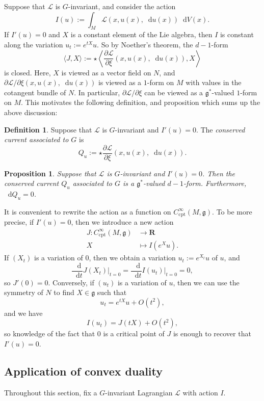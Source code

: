\documentclass[reqno,11pt]{amsart}
\newcommand{\RR}{\mathbf{R}}
\newcommand*\dif{\mathop{}\!\mathrm{d}}
\newcommand{\Lagrange}{\mathscr L}
\newcommand{\dfn}[1]{\emph{#1}\index{#1}}
\newcommand{\cpt}{\mathrm{cpt}}
\newtheorem{proposition}[theorem]{Proposition}
\theoremstyle{definition}
\newtheorem{definition}[theorem]{Definition}
\numberwithin{equation}{section}
\begin{document}
Suppose that $\Lagrange$ is $G$-invariant, and consider the action
$$I(u) := \int_M \Lagrange(x, u(x), \dif u(x)) \dif V(x).$$
If $I'(u) = 0$ and $X$ is a constant element of the Lie algebra, then $I$ is constant along the variation $u_t := e^{tX} u$.
So by Noether's theorem, the $d - 1$-form 
$$\langle J, X\rangle := \star \left\langle\frac{\partial \Lagrange}{\partial \xi}(x, u(x), \dif u(x)), X\right\rangle$$
is closed.
Here, $X$ is viewed as a vector field on $N$, and $\partial \Lagrange/\partial \xi(x, u(x), \dif u(x))$ is viewed as a $1$-form on $M$ with values in the cotangent bundle of $N$.
In particular, $\partial \Lagrange/\partial \xi$ can be viewed as a $\mathfrak g^*$-valued $1$-form on $M$.
This motivates the following definition, and proposition which sums up the above discussion:

\begin{definition}
Suppose that $\Lagrange$ is $G$-invariant and $I'(u) = 0$.
The \dfn{conserved current associated to $G$} is 
$$Q_u := \star \frac{\partial \Lagrange}{\partial \xi}(x, u(x), \dif u(x)).$$
\end{definition}

\begin{proposition}
Suppose that $\Lagrange$ is $G$-invariant and $I'(u) = 0$.
Then the conserved current $Q_u$ associated to $G$ is a $\mathfrak g^*$-valued $d - 1$-form.
Furthermore, $\dif Q_u = 0$.
\end{proposition}

It is convenient to rewrite the action as a function on $C^\infty_\cpt(M, \mathfrak g)$.
To be more precise, if $I'(u) = 0$, then we introduce a new action
\begin{align*}
J: C^\infty_\cpt(M, \mathfrak g) &\to \RR \\
X &\mapsto I(e^X u).
\end{align*}
If $(X_t)$ is a variation of $0$, then we obtain a variation $u_t := e^{X_t} u$ of $u$, and 
$$\frac{\dif}{\dif t} J(X_t)\bigg|_{t = 0} = \frac{\dif}{\dif t} I(u_t)\bigg|_{t = 0} = 0,$$
so $J'(0) = 0$.
Conversely, if $(u_t)$ is a variation of $u$, then we can use the symmetry of $N$ to find $X \in \mathfrak g$ such that 
$$u_t = e^{tX}u + O(t^2),$$
and we have 
$$I(u_t) = J(tX) + O(t^2),$$
so knowledge of the fact that $0$ is a critical point of $J$ is enough to recover that $I'(u) = 0$.


\subsection{Application of convex duality}
Throughout this section, fix a $G$-invariant Lagrangian $\Lagrange$ with action $I$.
\end{document}
